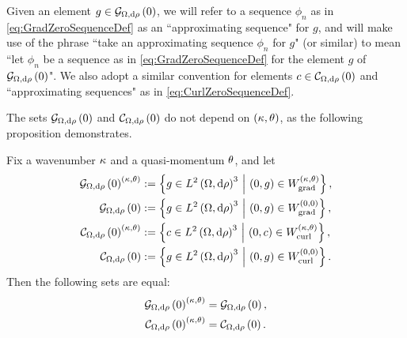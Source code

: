 Given an element $g\in\gradZero{\ddom}{\rho}$, we will refer to a sequence $\phi_n$ as in \eqref{eq:GradZeroSequenceDef} as an ``approximating sequence" for $g$, and will make use of the phrase ``take an approximating sequence $\phi_n$ for $g$" (or similar) to mean ``let $\phi_n$ be a sequence as in \eqref{eq:GradZeroSequenceDef} for the element $g$ of $\gradZero{\ddom}{\rho}$".
We also adopt a similar convention for elements $c\in\curlZero{\ddom}{\rho}$ and ``approximating sequences" as in \eqref{eq:CurlZeroSequenceDef}.

The sets $\gradZero{\ddom}{\rho}$ and $\curlZero{\ddom}{\rho}$ do not depend on $\kt$, as the following proposition demonstrates.
\begin{prop} \label{prop:ZeroInvariantUnderQM-Wavenumber}
	Fix a wavenumber $\wavenumber$ and a quasi-momentum $\qm$, and let
	\begin{align*}
		\gradZero{\ddom}{\rho}^{\kt} &:= \clbracs{ g\in \ltwo{\ddom}{\rho}^3 \setVert \bracs{0,g}\in W^{\kt}_\mathrm{grad} }, \\
		\gradZero{\ddom}{\rho} &:= \clbracs{ g\in \ltwo{\ddom}{\rho}^3 \setVert \bracs{0,g}\in W^{\bracs{0, 0}}_\mathrm{grad} }, \\
		\curlZero{\ddom}{\rho}^{\kt} &:= \clbracs{ c\in \ltwo{\ddom}{\rho}^3 \setVert \bracs{0,c}\in W^{\kt}_\mathrm{curl} }, \\
		\curlZero{\ddom}{\rho} &:= \clbracs{ g\in \ltwo{\ddom}{\rho}^3 \setVert \bracs{0,g}\in W^{\bracs{0, 0}}_\mathrm{curl} }.
	\end{align*}
	Then the following sets are equal:
	\begin{align*}
		\gradZero{\ddom}{\rho}^{\kt} &= \gradZero{\ddom}{\rho}, \\
		\curlZero{\ddom}{\rho}^{\kt} &= \curlZero{\ddom}{\rho}.
	\end{align*}
\end{prop}
